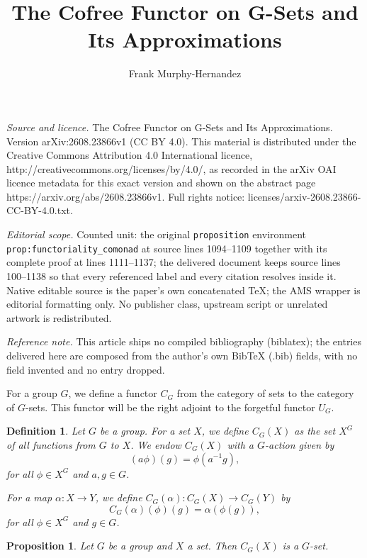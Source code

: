 \documentclass[10pt,a4paper]{amsart}
\newtheorem{proposition}{Proposition}
\newtheorem{definition}{Definition}
\begin{document}
\title[The Cofree Functor on G-Sets and Its Approximations]{The Cofree Functor on G-Sets and Its Approximations}
\author{Frank Murphy-Hernandez}
\date{}
\maketitle
\noindent\emph{Source and licence.} The Cofree Functor on G-Sets and Its Approximations. Version arXiv:2608.23866v1 (CC BY 4.0). This material is distributed under the Creative Commons Attribution 4.0 International licence, http://creativecommons.org/licenses/by/4.0/, as recorded in the arXiv OAI licence metadata for this exact version and shown on the abstract page https://arxiv.org/abs/2608.23866v1. Full rights notice: licenses/arxiv-2608.23866-CC-BY-4.0.txt.\par\smallskip
\noindent\textit{Editorial scope.} Counted unit: the original \texttt{proposition} environment \texttt{prop:functoriality\_comonad} at source lines 1094--1109 together with its complete proof at lines 1111--1137; the delivered document keeps source lines 100--1138 so that every referenced label and every citation resolves inside it. Native editable source is the paper's own concatenated TeX; the AMS wrapper is editorial formatting only. No publisher class, upstream script or unrelated artwork is redistributed.
\par\smallskip\noindent\textit{Reference note.} This article ships no compiled bibliography (biblatex); the entries delivered here are composed from the author's own BibTeX (.bib) fields, with no field invented and no entry dropped.
\label{sec:cofree}

For a group $G$, we define a functor $C_G$ from the category of sets to the category of $G$-sets. This functor will be the right adjoint to the forgetful functor $U_G$.

\begin{definition}
Let $G$ be a group. For a set $X$, we define $C_G(X)$ as the set $X^G$ of all functions from $G$ to $X$. We endow $C_G(X)$ with a $G$-action given by
\[
(a\phi)(g) = \phi(a^{-1}g),
\]
for all $\phi \in X^G$ and $a, g \in G$.

For a map $\alpha \colon X \longrightarrow Y$, we define $C_G(\alpha) \colon C_G(X) \longrightarrow C_G(Y)$ by
\[
C_G(\alpha)(\phi)(g) = \alpha(\phi(g)),
\]
for all $\phi \in X^G$ and $g \in G$.
\end{definition}

\begin{proposition}\label{prop:cofree_Gset}
Let $G$ be a group and $X$ a set. Then $C_G(X)$ is a $G$-set.
\end{proposition}
\end{document}
